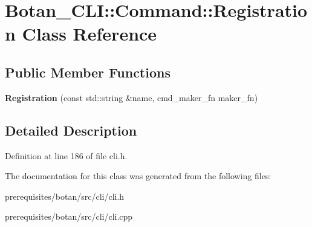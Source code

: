\hypertarget{class_botan___c_l_i_1_1_command_1_1_registration}{}\section{Botan\+\_\+\+C\+LI\+:\+:Command\+:\+:Registration Class Reference}
\label{class_botan___c_l_i_1_1_command_1_1_registration}
\subsection*{Public Member Functions}
\begin{DoxyCompactItemize}
\item 
\mbox{\label{class_botan___c_l_i_1_1_command_1_1_registration_ad17eae23a0baf87d0e93422505553b82}} 
{\bfseries Registration} (const std\+::string \&name, cmd\+\_\+maker\+\_\+fn maker\+\_\+fn)
\end{DoxyCompactItemize}


\subsection{Detailed Description}


Definition at line 186 of file cli.\+h.



The documentation for this class was generated from the following files\+:\begin{DoxyCompactItemize}
\item 
prerequisites/botan/src/cli/cli.\+h\item 
prerequisites/botan/src/cli/cli.\+cpp\end{DoxyCompactItemize}
